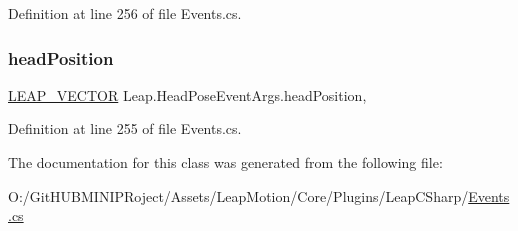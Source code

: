 Definition at line 256 of file Events.\+cs.

\mbox{\label{class_leap_1_1_head_pose_event_args_a1c084aa1bf86ab53ec7bda86847dbe3a}} 
\subsubsection{\texorpdfstring{headPosition}{headPosition}}
{\footnotesize\ttfamily \mbox{\hyperlink{struct_leap_internal_1_1_l_e_a_p___v_e_c_t_o_r}{L\+E\+A\+P\+\_\+\+V\+E\+C\+T\+OR}} Leap.\+Head\+Pose\+Event\+Args.\+head\+Position\hspace{0.3cm}{\ttfamily [get]}, {\ttfamily [set]}}



Definition at line 255 of file Events.\+cs.



The documentation for this class was generated from the following file\+:\begin{DoxyCompactItemize}
\item 
O\+:/\+Git\+H\+U\+B\+M\+I\+N\+I\+P\+Roject/\+Assets/\+Leap\+Motion/\+Core/\+Plugins/\+Leap\+C\+Sharp/\mbox{\hyperlink{_events_8cs}{Events.\+cs}}\end{DoxyCompactItemize}
